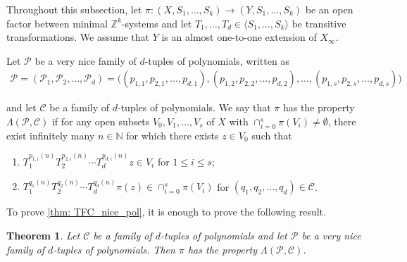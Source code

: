 \documentclass[11pt,reqno]{amsart}
\newcommand{\Z}{\mathbb{Z}}
\newcommand{\N}{\mathbb{N}}
\newcommand{\cC}{{\mathcal C}}
\newcommand{\cP}{{\mathcal P}}
\newtheorem{theorem}{Theorem}[section]
\theoremstyle{definition}
\theoremstyle{remark}
\begin{document}
Throughout this subsection, let $\pi\colon(X,S_{1},\dots,S_{k})\to (Y,S_{1},\dots,S_k)$ be an open factor between minimal $\Z^{k}$-systems and  let $T_{1},\dots,T_{d}\in \langle S_{1},\dots,S_{k} \rangle$ be transitive transformations. We assume that $Y$ is an almost one-to-one extension of $X_\infty$.

Let $\cP$ be a very nice family of $d$-tuples of polynomials, written as\begin{align*}
    \cP=(\cP_1,\cP_2,\dots,\cP_{d}) = \big((p_{1,1},p_{2,1},\dots,p_{d,1}),(p_{1,2},p_{2,2},\dots,p_{d,2}),\dots,(p_{1,s},p_{2,s},\dots,p_{d,s})\big)
\end{align*}  

and let $\cC$ be a family of $d$-tuples of polynomials. We say that $\pi$ has the property $\Lambda(\cP,\cC)$ if for any open subsets $V_{0},V_{1},\dots,V_{s}$ of $X$ with $\cap_{i=0}^{s} \pi(V_{i})\neq \emptyset$, there exist infinitely many $n\in\N$ for which there exists $z\in V_{0}$ such that\begin{enumerate}
    \item $T_{1}^{p_{1,i}(n)}T_2^{p_{2,i}(n)}\cdots T_{d}^{p_{d,i}(n)} z\in V_{i}$ for $1\leq i \leq s$;
    \item $T_1^{q_1(n)}T_2^{q_2(n)}\cdots T_{d}^{q_d(n)}\pi(z)\in \cap_{i=0}^{s} \pi(V_{i})$ for $(q_1,q_2,\dots,q_d)\in \cC$.
\end{enumerate}

To prove \cref{thm: TFC_nice_pol}, it is enough to prove the following result.\begin{theorem}
    Let $\cC$ be a family of $d$-tuples of polynomials and let $\cP$ be a very nice family of $d$-tuples of polynomials. Then $\pi$ has the property $\Lambda(\cP,\cC)$.
\end{theorem}
\end{document}
